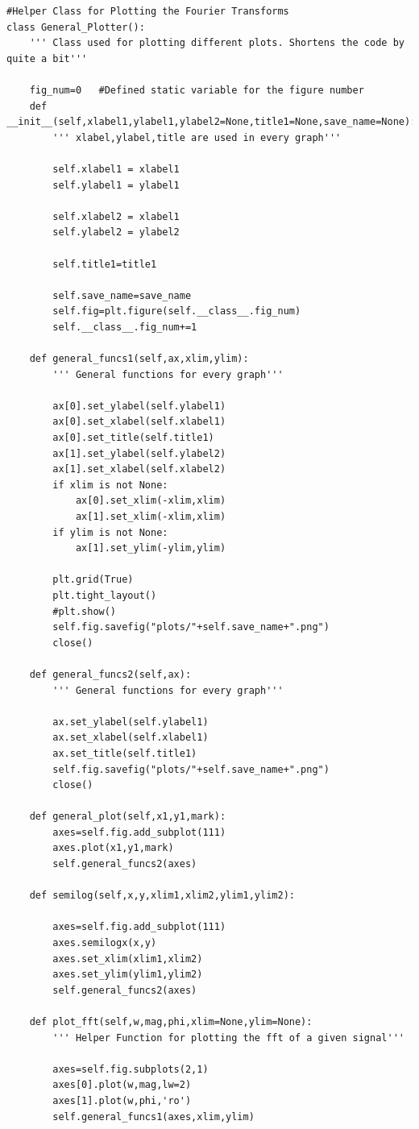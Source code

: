 \documentclass[11pt, a4paper]{article}
\begin{document}
\begin{lstlisting}
#Helper Class for Plotting the Fourier Transforms
class General_Plotter():
    ''' Class used for plotting different plots. Shortens the code by quite a bit'''
    
    fig_num=0   #Defined static variable for the figure number
    def __init__(self,xlabel1,ylabel1,ylabel2=None,title1=None,save_name=None):
        ''' xlabel,ylabel,title are used in every graph''' 

        self.xlabel1 = xlabel1
        self.ylabel1 = ylabel1
        
        self.xlabel2 = xlabel1
        self.ylabel2 = ylabel2
        
        self.title1=title1

        self.save_name=save_name
        self.fig=plt.figure(self.__class__.fig_num)
        self.__class__.fig_num+=1

    def general_funcs1(self,ax,xlim,ylim):
        ''' General functions for every graph'''
        
        ax[0].set_ylabel(self.ylabel1)
        ax[0].set_xlabel(self.xlabel1)
        ax[0].set_title(self.title1)
        ax[1].set_ylabel(self.ylabel2)
        ax[1].set_xlabel(self.xlabel2)
        if xlim is not None:
            ax[0].set_xlim(-xlim,xlim)
            ax[1].set_xlim(-xlim,xlim)
        if ylim is not None:
            ax[1].set_ylim(-ylim,ylim)

        plt.grid(True)
        plt.tight_layout()
        #plt.show()
        self.fig.savefig("plots/"+self.save_name+".png")
        close()
    
    def general_funcs2(self,ax):
        ''' General functions for every graph'''
        
        ax.set_ylabel(self.ylabel1)
        ax.set_xlabel(self.xlabel1)
        ax.set_title(self.title1)
        self.fig.savefig("plots/"+self.save_name+".png")
        close()
    
    def general_plot(self,x1,y1,mark):
        axes=self.fig.add_subplot(111)
        axes.plot(x1,y1,mark)
        self.general_funcs2(axes)

    def semilog(self,x,y,xlim1,xlim2,ylim1,ylim2):
        
        axes=self.fig.add_subplot(111)
        axes.semilogx(x,y)
        axes.set_xlim(xlim1,xlim2)
        axes.set_ylim(ylim1,ylim2)
        self.general_funcs2(axes)

    def plot_fft(self,w,mag,phi,xlim=None,ylim=None):
        ''' Helper Function for plotting the fft of a given signal'''
        
        axes=self.fig.subplots(2,1)
        axes[0].plot(w,mag,lw=2)
        axes[1].plot(w,phi,'ro')
        self.general_funcs1(axes,xlim,ylim)

\end{lstlisting}
\end{document}
